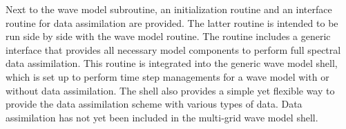 Next to the wave model subroutine, an initialization routine and an interface
routine for data assimilation are provided. The latter routine is intended to
be run side by side with the wave model routine. The routine includes a
generic interface that provides all necessary model components to perform full
spectral data assimilation. This routine is integrated into the generic wave
model shell, which is set up to perform time step managements for a wave model
with or without data assimilation. The shell also provides a simple yet
flexible way to provide the data assimilation scheme with various types of
data. Data assimilation has not yet been included in the multi-grid wave model
shell.
